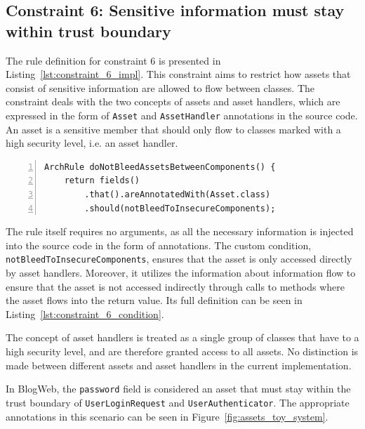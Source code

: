 \subsection{Constraint 6: Sensitive information must stay within trust boundary}
The rule definition for constraint 6 is presented in Listing~\ref{lst:constraint_6_impl}.
This constraint aims to restrict how assets that consist of sensitive information are allowed to flow between classes. The constraint deals with the two concepts of assets and asset handlers, which are expressed in the form of \texttt{Asset} and \texttt{AssetHandler} annotations in the source code. An asset is a sensitive member that should only flow to classes marked with a high security level, i.e. an asset handler.

\begin{minipage}{\linewidth}
\begin{lstlisting}[caption={Rule definition for constraint 6.}, captionpos=b, label=lst:constraint_6_impl, numbers=left]
ArchRule doNotBleedAssetsBetweenComponents() {
    return fields()
        .that().areAnnotatedWith(Asset.class)
        .should(notBleedToInsecureComponents);
\end{lstlisting}
\end{minipage}

The rule itself requires no arguments, as all the necessary information is injected into the source code in the form of annotations. The custom condition, \texttt{notBleedTo\-InsecureComponents}, ensures that the asset is only accessed directly by asset handlers. Moreover, it utilizes the information about information flow to ensure that the asset is not accessed indirectly through calls to methods where the asset flows into the return value. Its full definition can be seen in Listing~\ref{lst:constraint_6_condition}.

The concept of asset handlers is treated as a single group of classes that have to a high security level, and are therefore granted access to all assets. No distinction is made between different assets and asset handlers in the current implementation.

In BlogWeb, the \texttt{password} field is considered an asset that must stay within the trust boundary of \texttt{UserLoginRequest} and \texttt{UserAuthenticator}. The appropriate annotations in this scenario can be seen in Figure~\ref{fig:assets_toy_system}.

